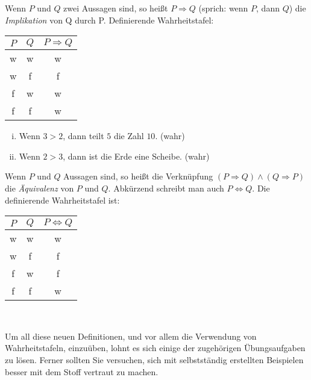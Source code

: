 \begin{mydef}
    Wenn $P$ und $Q$ zwei Aussagen sind, so heißt $P \Rightarrow Q$ (sprich: wenn $P$, dann $Q$) die \textit{Implikation} von Q durch P. 
    Definierende Wahrheitstafel: \newline
    \begin{tabular}{ c | c | c }
        $P$ & $Q$ & $P \Rightarrow Q$ \\
        \hline
        w & w & w \\
        w & f & f \\
        f & w & w \\
        f & f & w \\
    \end{tabular}
\end{mydef}

\begin{example}
    \begin{enumerate}[(i)]
        \item 
        Wenn $ 3 > 2$, dann teilt $5$ die Zahl $10$.  (wahr)
        \item 
        Wenn $2 > 3$, dann ist die Erde eine Scheibe. (wahr)
    \end{enumerate}
\end{example}

\begin{mydef}
    Wenn $P$ und $Q$ Aussagen sind, so heißt die Verknüpfung $(P \Rightarrow Q) \wedge (Q \Rightarrow P)$ die \textit{Äquivalenz} von $P$ und $Q$. 
    Abkürzend schreibt man auch $P \iff Q$. Die definierende Wahrheitstafel ist: \newline
    \begin{tabular}{ c | c | c }
        $P$ & $Q$ & $P \iff Q$ \\
        \hline
        w & w & w \\
        w & f & f \\
        f & w & f \\
        f & f & w \\
    \end{tabular}
\end{mydef}\ 
\newline 

Um all diese neuen Definitionen, und vor allem die Verwendung von Wahrheitstafeln, einzuüben, lohnt es sich einige der zugehörigen Übungsaufgaben zu lösen. 
Ferner sollten Sie versuchen, sich mit selbstständig erstellten Beispielen besser mit dem Stoff vertraut zu machen. 